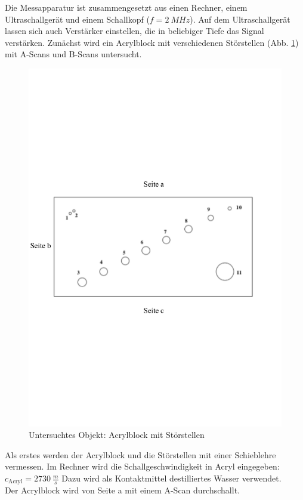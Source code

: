 Die Messapparatur ist zusammengesetzt aus einen Rechner, einem Ultraschallgerät und einem Schallkopf ($f=\SI{2}{MHz}$).
Auf dem Ultraschallgerät lassen sich auch Verstärker einstellen, die in beliebiger Tiefe das Signal verstärken.
Zunächst wird ein Acrylblock mit verschiedenen Störstellen (Abb. \ref{fig:block}) mit A-Scans und B-Scans untersucht.
\begin{figure}[h!]
  \centering
  \includegraphics[width=\textwidth]{block.pdf}
  \caption{Untersuchtes Objekt: Acrylblock mit Störstellen \cite{1}}
  \label{fig:block}
\end{figure}
Als erstes werden der Acrylblock und die Störstellen mit einer Schieblehre vermessen.
Im Rechner wird die Schallgeschwindigkeit in Acryl eingegeben: $c_{\text{Acryl}}=\SI{2730}{\frac{m}{s}}$ \cite{acryl}
Dazu wird als Kontaktmittel destilliertes Wasser verwendet.
\\Der Acrylblock wird von Seite a mit einem A-Scan durchschallt.

